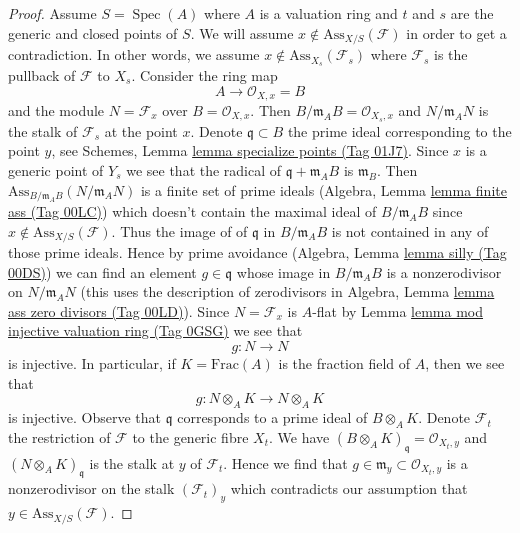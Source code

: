 \documentclass{amsart}
\theoremstyle{plain}
\theoremstyle{definition}
\theoremstyle{remark}
\numberwithin{equation}{subsection}
\def\Spec{\mathop{\mathrm{Spec}}}
\begin{document}
\begin{proof}
\medskip\noindent
Assume $S = \Spec(A)$ where $A$ is a valuation ring
and $t$ and $s$ are the generic and closed points of $S$.
We will assume $x \not \in \text{Ass}_{X/S}(\mathcal{F})$
in order to get a contradiction. In other words, we assume
$x \not \in \text{Ass}_{X_s}(\mathcal{F}_s)$ where
$\mathcal{F}_s$ is the pullback of $\mathcal{F}$ to $X_s$.
Consider the ring map
$$
A \longrightarrow \mathcal{O}_{X, x} = B
$$
and the module $N = \mathcal{F}_x$ over $B = \mathcal{O}_{X, x}$.
Then $B/\mathfrak m_A B = \mathcal{O}_{X_s, x}$ and
$N/\mathfrak m_A N$ is the stalk of $\mathcal{F}_s$ at the point $x$.
Denote $\mathfrak q \subset B$ the prime ideal corresponding to the
point $y$, see Schemes, Lemma \href{https://stacks.math.columbia.edu/tag/01J7}{lemma specialize points (Tag 01J7)}.
Since $x$ is a generic point of $Y_s$ we see that the radical of
$\mathfrak q + \mathfrak m_A B$ is $\mathfrak m_B$.
Then $\text{Ass}_{B/\mathfrak m_A B}(N/\mathfrak m_A N)$
is a finite set of prime ideals (Algebra, Lemma \href{https://stacks.math.columbia.edu/tag/00LC}{lemma finite ass (Tag 00LC)})
which doesn't contain the maximal ideal of $B/\mathfrak m_A B$
since $x \not \in \text{Ass}_{X/S}(\mathcal{F})$.
Thus the image of of $\mathfrak q$ in $B/\mathfrak m_A B$ is not
contained in any of those prime ideals. Hence
by prime avoidance (Algebra, Lemma \href{https://stacks.math.columbia.edu/tag/00DS}{lemma silly (Tag 00DS)})
we can find an element $g \in \mathfrak q$
whose image in $B/\mathfrak m_A B$ is a nonzerodivisor on
$N/\mathfrak m_A N$ (this uses the description of zerodivisors
in Algebra, Lemma \href{https://stacks.math.columbia.edu/tag/00LD}{lemma ass zero divisors (Tag 00LD)}). Since
$N = \mathcal{F}_x$ is $A$-flat by
Lemma \href{https://stacks.math.columbia.edu/tag/0GSG}{lemma mod injective valuation ring (Tag 0GSG)} we see that
$$
g : N \longrightarrow N
$$
is injective. In particular, if $K = \text{Frac}(A)$ is the
fraction field of $A$, then we see that
$$
g : N \otimes_A K \longrightarrow N \otimes_A K
$$
is injective. Observe that $\mathfrak q$ corresponds to a
prime ideal of $B \otimes_A K$. Denote $\mathcal{F}_t$ the
restriction of $\mathcal{F}$ to the generic fibre $X_t$. We have
$(B \otimes_A K)_{\mathfrak q} = \mathcal{O}_{X_t, y}$
and $(N \otimes_A K)_\mathfrak q$
is the stalk at $y$ of $\mathcal{F}_t$. Hence we find
that $g \in \mathfrak m_y \subset \mathcal{O}_{X_t, y}$
is a nonzerodivisor on the stalk $(\mathcal{F}_t)_y$
which contradicts our assumption that $y \in \text{Ass}_{X/S}(\mathcal{F})$.
\end{proof}
\end{document}
